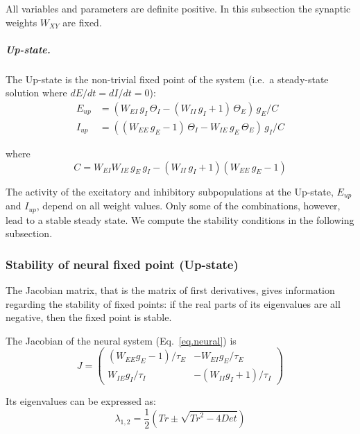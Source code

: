 \documentclass[twocolumn]{article}
\newcommand{\EE}{\mathit{EE}}
\newcommand{\EI}{\mathit{EI}}
\newcommand{\IE}{\mathit{IE}}
\newcommand{\II}{\mathit{II}}
\newcommand{\up}{\mathit{up}}
\newcommand{\De}{\mathit{Det}}
\newcommand{\Tr}{\mathit{Tr}}
\begin{document}
\noindent All variables and parameters are definite positive. In this subsection the synaptic weights $W_{\mathit{XY}}$ are fixed.

\subparagraph{Up-state.} The Up-state is the non-trivial fixed point of the system (i.e.\ a steady-state solution where $dE/dt=dI/dt=0$):
\begin{equation}
\begin{aligned}
E_{\up} & = (W_{\EI} \, g_I \, \Theta_I - (W_{\II} \, g_I + 1) \, \Theta_E) \, g_E / C \\
I_{\up} & = ((W_{\EE} \, g_E - 1) \, \Theta_I - W_{\IE} \, g_E \, \Theta_E) \, g_I / C
\end{aligned}
\label{eq.upstate_orig}
\end{equation}

\noindent where
\begin{equation}
C = W_{\EI} W_{\IE} \, g_E\, g_I - (W_{\II} \, g_I + 1)(W_{\EE} \, g_E - 1)
\label{eq.den}
\end{equation}

The activity of the excitatory and inhibitory subpopulations at the Up-state, $E_{\up}$ and $I_{\up}$, depend on all weight values. Only some of the combinations, however, lead to a stable steady state. We compute the stability conditions in the following subsection.


\subsubsection{Stability of neural fixed point (Up-state)}

The Jacobian matrix, that is the matrix of first derivatives, gives information regarding the stability of fixed points: if the real parts of its eigenvalues are all negative, then the fixed point is stable.

The Jacobian of the neural system (Eq.\ \ref{eq.neural}) is
\begin{equation}
J = \left(\begin{array}{rr}
(W_{\EE} g_E - 1)/\tau_E & -W_{\EI} g_E/\tau_E \\
W_{\IE} g_I/\tau_I & -(W_{\II} g_I + 1)/\tau_I
\end{array}\right)
\end{equation}

\noindent Its eigenvalues can be expressed as:
\begin{equation}
\lambda_{1,2} = \frac{1}{2}\left(\Tr \pm \sqrt{\Tr^2 - 4\De} \right)
\label{eq.neural.eigvals}
\end{equation}
\end{document}
